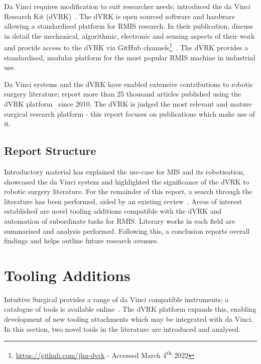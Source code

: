 \documentclass[english]{sobraep}
\begin{document}
\par{Da Vinci requires modification to suit researcher needs;  \citeauthor{dvrk} introduced the da Vinci Research Kit (dVRK)~\cite{dvrk}. The dVRK is open sourced software and hardware allowing a standardised platform for RMIS research. In their publication, \citeauthor{dvrk} discuss in detail the mechanical, algorithmic, electronic and sensing aspects of their work and provide access to the dVRK via GitHub channels\footnote{\url{https://github.com/jhu-dvrk} - Accessed March 4\textsuperscript{th} 2022}~\cite{dvrk}. The dVRK provides a standardised, modular platform for the most popular RMIS machine in industrial use.}

\par{Da Vinci systems and the dVRK have enabled extensive contributions to robotic surgery literature; \citeauthor{10-years-dvrk} report more than 25 thousand articles published using the dVRK platform~\cite{10-years-dvrk} since 2010. The dVRK is judged the most relevant and mature surgical research platform - this report focuses on publications which make use of it. }


\subsection{Report Structure}
\par{Introductory material has explained the use-case for MIS and its robotisation, showcased the da Vinci system and highlighted the significance of the dVRK to robotic surgery literature. For the remainder of this report, a search through the literature has been performed, aided by an existing review~\cite{10-years-dvrk}. Areas of interest established are novel tooling additions compatible with the dVRK and automation of subordinate tasks for RMIS. Literary works in each field are summarised and analysis performed. Following this, a conclusion reports overall findings and helps outline future research avenues. }

\section{Tooling Additions}\label{sec:mechanical}
\par{Intuitive Surgical provides a range of da Vinci compatible instruments; a catalogue of tools is available online~\cite{da-vinci-catalogue}. 
The dVRK platform expands this, enabling development of new tooling attachments which may be integrated with da Vinci. In this section, two novel tools in the literature are introduced and analysed.} 
\end{document}
